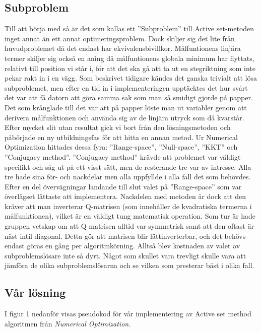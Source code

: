 \subsection{Subproblem}
Till att börja med så är det som kallas ett ''Subproblem'' till Active set-metoden inget annat än ett annat optimeringsproblem. Dock skiljer sig det lite från huvudproblemet då det endast har ekvivalensbivillkor. Målfuntionens linjära termer skiljer sig också en aning då målfuntionens globala minimum har flyttats, relativt till position vi står i, för att det ska gå att ta ut en stegriktning som inte pekar rakt in i en vägg.
Som beskrivet tidigare kändes det ganska trivialt att lösa subproblemet, men efter en tid in i implementeringen upptäcktes det hur svårt det var att få datorn att göra samma sak som man så smidigt gjorde på papper. Det som krånglade till det var att på papper löste man ut variabler genom att derivera målfunktionen och använda sig av de linjära utryck som då kvarstår. Efter mycket slit utan resultat gick vi bort från den lösningsmetoden och påbörjade en ny utbildningsfas för att hitta en annan metod. Ur Numerical Optimization hittades dessa fyra: ''Range-space'', ''Null-space'', ''KKT'' och ''Conjugacy method''. ''Conjugacy method'' krävde att problemet var väldigt specifikt och såg ut på ett visst sätt, men de resterande tre var av intresse. Alla tre hade sina för- och nackdelar men alla uppfyllde i alla fall det som behövdes. Efter en del övervägningar landande till slut valet på ''Range-space'' som var överlägset lättaste att implementera. Nackdelen med metoden är dock att den kräver att man inverterar Q-matrisen (som innehåller de kvadratiska termerna i målfunktionen), vilket är en väldigt tung matematisk operation. Som tur är hade gruppen vetskap om att Q-matrisen alltid var symmetrisk samt att den oftast är näst intil diagonal. Detta gör att matrisen blir lättinverterbar, och det behövs endast göras en gång per algoritmkörning. Alltså blev kostnaden av valet av subproblemslösare inte så dyrt. Något som skullet vara trevligt skulle vara att jämföra de olika subproblemslösarna och se vilken som presterar bäst i olika fall.

\subsection{Vår lösning}
I figur 1 nedanför visas pseudokod för vår implementering av Active set method algoritmen från \emph{Numerical Optimization}.


